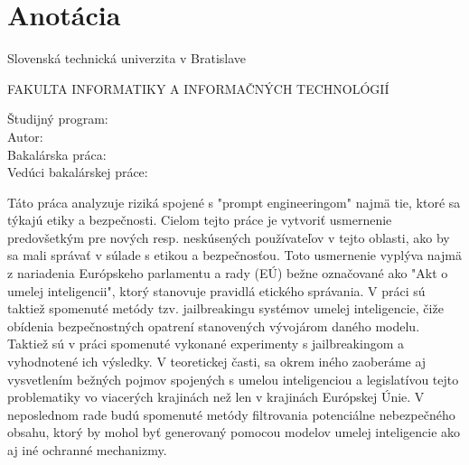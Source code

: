\thispagestyle{empty}

\section*{Anotácia}

\begin{minipage}[t]{1\columnwidth}%
Slovenská technická univerzita v Bratislave

FAKULTA INFORMATIKY A INFORMAČNÝCH TECHNOLÓGIÍ

Študijný program: \hspace{1.4cm} \myStudyProgramSK\\

\noindent
Autor: \hspace{3.5cm} \myName \\
Bakalárska práca: \hspace{1.5cm} \myTitleSK \\
Vedúci bakalárskej práce: \hspace{0.12cm} \mySupervisor \\
\noindent
\myDateSK%
\end{minipage}

\bigskip{}

Táto práca analyzuje riziká spojené s "prompt engineeringom" najmä tie, ktoré sa týkajú etiky a bezpečnosti. Cielom tejto práce je vytvoriť usmernenie predovšetkým pre nových resp. neskúsených používateľov v tejto oblasti, ako by sa mali správať v súlade s etikou a bezpečnosťou. Toto usmernenie vyplýva najmä z nariadenia Európskeho parlamentu a rady (EÚ) bežne označované ako "Akt o umelej inteligencii", ktorý stanovuje pravidlá etického správania. V práci sú taktiež spomenuté metódy tzv. jailbreakingu systémov umelej inteligencie, čiže obídenia bezpečnostných opatrení stanovených vývojárom daného modelu. Taktiež sú v práci spomenuté vykonané experimenty s jailbreakingom a vyhodnotené ich výsledky. V teoretickej časti, sa okrem iného zaoberáme aj vysvetlením bežných pojmov spojených s umelou inteligenciou a legislatívou tejto problematiky vo viacerých krajinách než len v krajinách Európskej Únie. V neposlednom rade budú spomenuté metódy filtrovania potenciálne nebezpečného obsahu, ktorý by mohol byť generovaný pomocou modelov umelej inteligencie ako aj iné ochranné mechanizmy.


\newpage{}\thispagestyle{empty}

\newpage
\thispagestyle{empty}
\mbox{}
\newpage

